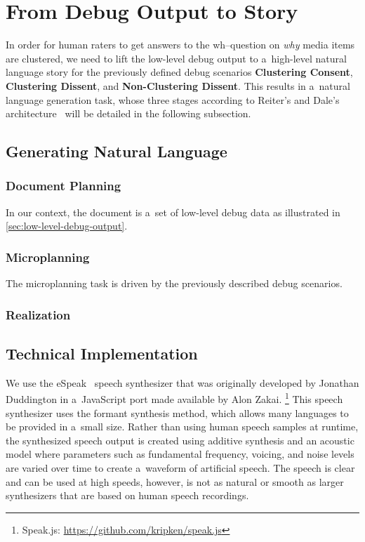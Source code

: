 \documentclass{article}
\begin{document}
\section{From Debug Output to Story}
\label{sec:from-debug-output-to-story}

In order for human raters to get answers to the wh--question
on \emph{why} media items are clustered,
we need to lift the low-level debug output
to a~high-level natural language story
for the previously defined debug scenarios
\textbf{Clustering Consent}, \textbf{Clustering Dissent},
and \textbf{Non-Clustering Dissent}.
This results in a~natural language generation task,
whose three stages according to Reiter's and Dale's architecture~%
\cite{reiter2000building} will be detailed in the following subsection.

\subsection{Generating Natural Language}

\subsubsection{Document Planning}

In our context, the document is a~set of low-level debug data 
as illustrated in \autoref{sec:low-level-debug-output}.

\subsubsection{Microplanning}

The microplanning task is driven by the previously described debug scenarios.


\subsubsection{Realization}

\subsection{Technical Implementation}

We use the eSpeak~\cite{duddington2012espeak}
speech synthesizer that was originally developed by Jonathan Duddington
in a~JavaScript port made available by Alon Zakai.%
\footnote{Speak.js: \url{https://github.com/kripken/speak.js}}
This speech synthesizer uses the formant synthesis method,
which allows many languages to be provided in a~small size.
Rather than using human speech samples at runtime,
the synthesized speech output is created using additive synthesis and an acoustic model
where parameters such as fundamental frequency, voicing, and noise levels
are varied over time to create a~waveform of artificial speech. 
The speech is clear and can be used at high speeds,
however, is not as natural or smooth as larger synthesizers
that are based on human speech recordings.
\end{document}

